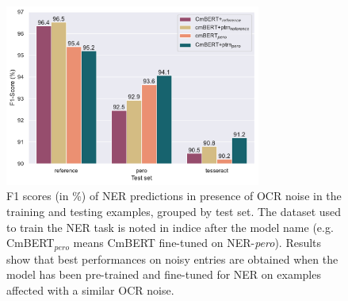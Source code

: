 \begin{figure}
    \centering
    \includegraphics[width=0.75\textwidth]{images/experiment_2_f1_with_noise_graph.pdf}
    \caption{\label{fig:exp_2_eval_ner}F1 scores (in \%) of NER predictions in presence of OCR noise in the training and testing examples, grouped by test set. The dataset used to train the NER task is noted in indice after the model name (e.g. CmBERT$_{pero}$ means CmBERT fine-tuned on NER-\emph{pero}).  Results show that best performances on noisy entries are obtained when the model has been pre-trained and fine-tuned for NER on examples affected with a similar OCR noise.}
\end{figure}

